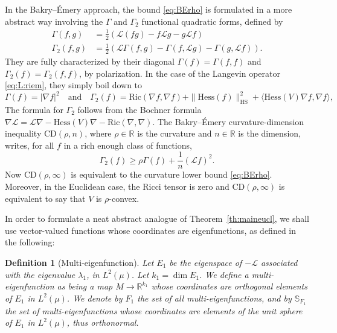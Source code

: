 \documentclass[10pt,reqno]{amsart}
\newtheorem{definition}[theorem]{Definition}
\numberwithin{equation}{section}
\begin{document}
In the Bakry--Émery approach, the bound \eqref{eq:BErho} is formulated in
a more abstract way involving the $\Gamma$ and $\Gamma_2$ functional quadratic
forms, defined by 
\begin{align}
  \Gamma(f,g)&=\tfrac{1}{2}(\mathcal{L}(fg)-f\mathcal{L} g-g\mathcal{L} f)\\
  \Gamma_2(f,g)&=\tfrac{1}{2}(\mathcal{L}\Gamma(f,g)-\Gamma(f,\mathcal{L} g)-\Gamma(g,\mathcal{L} f)).
\end{align}
They are fully characterized by their diagonal $\Gamma(f)=\Gamma(f,f)$ and
$\Gamma_2(f)=\Gamma_2(f,f)$, by polarization. In the case of the Langevin
operator \eqref{eq:L:riem}, they simply boil down to
\begin{equation}
  \Gamma(f)=|\nabla f|^2
  \quad\text{and}\quad
  \Gamma_2(f)=\mathrm{Ric}(\nabla f,\nabla f)+\|\mathrm{Hess}(f)\|_{\mathrm{HS}}^2+\langle\mathrm{Hess}(V)\nabla f, \nabla f \rangle,
\end{equation}
The formula for $\Gamma_2$ follows from the Bochner formula
$\nabla\mathcal{L}=\mathcal{L}\nabla-\mathrm{Hess}(V)\nabla-\mathrm{Ric}(\nabla,\nabla)$.
The Bakry--Émery curvature-dimension inequality $\mathrm{CD}(\rho,n)$,
where $\rho\in\mathbb{R}$ is the curvature and $n\in\mathbb{R}$ is the
dimension, writes, for all $f$ in a rich enough class of functions,
\begin{equation}
  \Gamma_2(f)\geq\rho\Gamma(f)+\frac{1}{n}(\mathcal{L} f)^2.
\end{equation}
Now $\mathrm{CD}(\rho,\infty)$ is equivalent to the curvature lower bound
\eqref{eq:BErho}. Moreover, in the Euclidean case, the Ricci tensor is zero
and $\mathrm{CD}(\rho,\infty)$ is equivalent to say that $V$ is $\rho$-convex.
 
In order to formulate a neat abstract analogue of Theorem~\ref{th:maineucl},
we shall use vector-valued functions whose coordinates are eigenfunctions, as
defined in the following:

\begin{definition}[Multi-eigenfunction]\label{df:multeig}
  Let $E_1$ be the eigenspace of $-\mathcal{L}$ associated with the eigenvalue
  $\lambda_1$, in $L^2(\mu)$. Let $k_1 = \dim{E_1}$. We define a
  multi-eigenfunction as being a map $M \to\mathbb{R}^{k_1}$ whose coordinates are
  orthogonal elements of $E_1$ in $L^2(\mu)$. We denote by $F_1$ the set of
  all multi-eigenfunctions, and by $\mathbb{S}_{F_1}$ the set of multi-eigenfunctions
  whose coordinates are elements of the unit sphere of $E_1$ in $L^2(\mu)$,
  thus orthonormal.
\end{definition}
\end{document}
